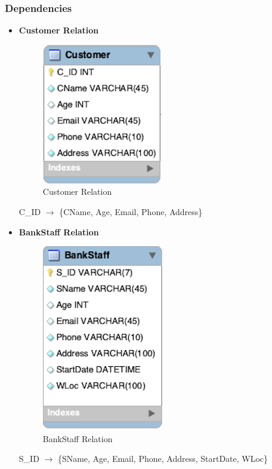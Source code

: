 \documentclass[12pt,a4paper]{article}
\begin{document}
 \subsubsection{Dependencies}
  \begin{itemize}
     \item \textbf{Customer Relation}
        \begin{figure}[H]
            \centering
            \includegraphics[]{Picture/CustomerRelation.png}
            \caption{Customer Relation}
        \end{figure}
     C\_ID $\longrightarrow$ \{CName, Age, Email, Phone, Address\}\\
     
     \item \textbf{BankStaff Relation}
        \begin{figure}[H]
            \centering
            \includegraphics[]{Picture/BankStaffRelation.png}
            \caption{BankStaff Relation}
        \end{figure}
     S\_ID $\longrightarrow$ \{SName, Age, Email, Phone, Address, StartDate, WLoc\}\\
     

\end{itemize}
\end{document}

